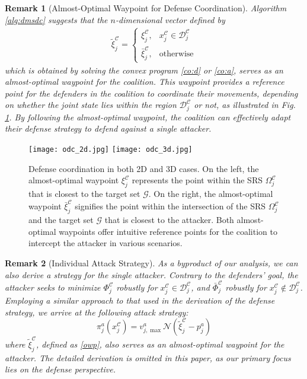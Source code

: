 \documentclass[journal]{IEEEtran}
\newtheorem{Remark}{\bf Remark}
\newcommand{\n}{\mathscr{N}}
\newcommand{\D}{\mathcal{D}}
\newcommand{\G}{\mathcal{G}}
\newcommand{\C}{\mathcal{C}}
\newcommand{\1}{\mathbf{1}}
\begin{document}
\begin{Remark}[Almost-Optimal Waypoint for Defense Coordination]
Algorithm \ref{alg:dmsdc} suggests that the $n$-dimensional vector defined by
\begin{equation}\label{owp}
	\begin{split}
		\tilde{\xi}^{\C}_j=
		\begin{cases}
		\xi^{\C}_j, &x^{\C}_j\in \D^{\C}_j\\
		\bar{\xi}^{\C}_j,& \mathrm{otherwise}
		\end{cases}	
    \end{split}
\end{equation}
which is obtained by solving the convex program \eqref{co:d} or \eqref{co:a}, serves as an almost-optimal waypoint for the coalition. This waypoint provides a reference point for the defenders in the coalition to coordinate their movements, depending on whether the joint state lies within the region $\D^{\C}_j$ or not, as illustrated in Fig. \ref{fig:odc}. By following the almost-optimal waypoint, the coalition can effectively adapt their defense strategy to defend against a single attacker.
\end{Remark}

\begin{figure}[tp!]
	\centering
	\texttt{[image: odc\_2d.jpg]}
	\texttt{[image: odc\_3d.jpg]}
	\caption{\footnotesize {Defense coordination in both 2D and 3D cases. On the left, the almost-optimal waypoint $\xi^\C_j$ represents the point within the SRS $\Omega^\C_j$ that is closest to the target set $\G$. On the right, the almost-optimal waypoint $\bar{\xi}^\C_j$ signifies the point within the intersection of the SRS $\Omega^\C_j$ and the target set $\G$ that is closest to the attacker. Both almost-optimal waypoints offer intuitive reference points for the coalition to intercept the attacker in various scenarios.}
	\label{fig:odc}}
\end{figure}

\begin{Remark}[Individual Attack Strategy]
As a byproduct of our analysis, we can also derive a strategy for the single attacker. Contrary to the defenders' goal, the attacker seeks to minimize $\Phi^\C_j$ robustly 
 for $x^\C_j\in \D^\C_j$, and $\bar{\Phi}^\C_j$ robustly for $x^\C_j\notin \D^\C_j$. Employing a similar approach to that used in the derivation of the defense strategy, we arrive at the following attack strategy:
\begin{equation}\label{as}
    \pi^a_j(x^\C_j)=v^a_{j,\max}\n(\tilde{\xi}^{\C}_j-p^a_j)
\end{equation}
where $\tilde{\xi}^{\C}_j$, defined as \eqref{owp}, also serves as an almost-optimal waypoint for the attacker. The detailed derivation is omitted in this paper, as our primary focus lies on the defense perspective.
\end{Remark}
\end{document}
